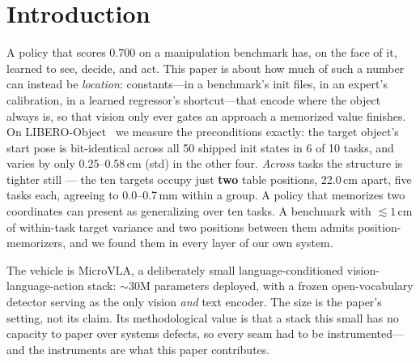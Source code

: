 \documentclass[10pt,letterpaper]{article}
\begin{document}
\section{Introduction}

A policy that scores 0.700 on a manipulation benchmark has, on the face of it,
learned to see, decide, and act. This paper is about how much of such a number
can instead be \emph{location}: constants---in a benchmark's init files, in an
expert's calibration, in a learned regressor's shortcut---that encode where the
object always is, so that vision only ever gates an approach a memorized value
finishes. On LIBERO-Object~\citep{liu2023libero} we measure the preconditions
exactly: the target object's start pose is bit-identical across all 50 shipped
init states in 6 of 10 tasks, and varies by only 0.25--0.58\,cm (std) in the
other four. \emph{Across} tasks the structure is tighter still --- the ten
targets occupy just \textbf{two} table positions, 22.0\,cm apart, five tasks
each, agreeing to 0.0--0.7\,mm within a group. A policy that memorizes two
coordinates can present as generalizing over ten tasks. A benchmark with
${\lesssim}1$\,cm of within-task target variance and two positions between them
admits position-memorizers, and we found them in every layer of our own system.

The vehicle is MicroVLA, a deliberately small language-conditioned
vision-language-action stack: ${\sim}30$M parameters deployed, with a frozen
open-vocabulary detector serving as the only vision \emph{and} text encoder.
The size is the paper's setting, not its claim. Its methodological value is
that a stack this small has no capacity to paper over systems defects, so every
seam had to be instrumented---and the instruments are what this paper
contributes.
\end{document}
